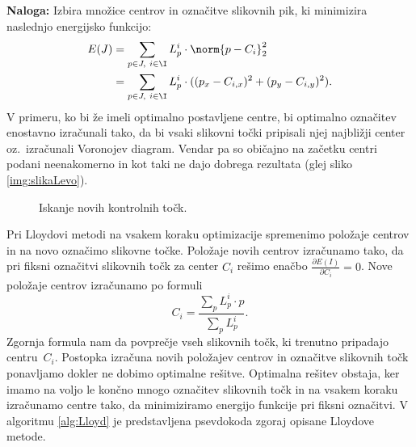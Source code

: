 \textbf{Naloga:} Izbira množice centrov in označitve slikovnih pik, ki minimizira naslednjo energijsko funkcijo:
%
\begin{align*}
E(J) & = \sum_{p \in J,\ i \in \I} L_p^i \cdot \norm{p - C_i}_2^2 \\
       & = \sum_{p \in J,\ i \in \I} L_p^i \cdot ((p_x - C_{i, x})^2 + (p_y - C_{i, y})^2) .
\end{align*}
%
V primeru, ko bi že imeli optimalno postavljene centre, bi optimalno označitev enostavno izračunali tako, da bi vsaki slikovni točki pripisali njej najbližji center oz.~izračunali Voronojev diagram. Vendar pa so običajno na začetku centri podani neenakomerno in kot taki ne dajo dobrega rezultata (glej sliko \ref{img:slikaLevo}).
%
\begin{figure}[htbp]
%
\centering
{}
%
%
\caption{Iskanje novih kontrolnih točk.}
\label{fig:slikaLevo}
\end{figure}
%
Pri Lloydovi metodi na vsakem koraku optimizacije spremenimo položaje centrov in na novo označimo slikovne točke. Položaje novih centrov izračunamo tako, da pri fiksni označitvi slikovnih točk za center $C_i$ rešimo enačbo $\frac{\partial E(I)}{\partial C_i} = 0$. Nove položaje centrov izračunamo po formuli
%
$$C_i = \frac{\sum_p L_p^i  \cdot p}{\sum_p L_p^i}.$$
%
Zgornja formula nam da povprečje vseh slikovnih točk, ki trenutno pripadajo centru~$C_i$. Postopka izračuna novih položajev centrov in oz\-na\-čit\-ve slikovnih točk ponavljamo dokler ne dobimo optimalne rešitve. Optimalna rešitev obstaja, ker imamo na voljo le končno mnogo označitev slikovnih točk in na vsakem koraku izračunamo centre tako, da minimiziramo energijo funkcije pri fiksni označitvi. V algoritmu \ref{alg:Lloyd} je predstavljena psevdokoda zgoraj opisane Lloydove metode.

